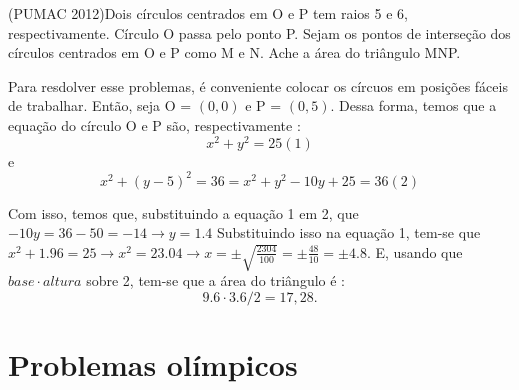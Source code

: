 \documentclass{article}
\begin{document}
\begin{tcolorbox}[colback=blue!5!white,colframe=blue!75!black,title=Problema 2]
(PUMAC 2012)Dois círculos centrados em O e P tem raios 5 e 6, respectivamente.
Círculo O passa pelo ponto P. Sejam os pontos de interseção dos círculos centrados em O e P como M e N.
Ache a área do triângulo MNP. 
\end{tcolorbox}
\begin{center}
\end{center}

Para resdolver esse problemas, é conveniente colocar os círcuos em posições fáceis de trabalhar. Então, seja O = $(0,0)$ e P = $(0,5)$. Dessa forma, temos que a equação do círculo O e P são, respectivamente : 
$$
x^2+ y^2 = 25 (1)
$$
e
$$
x^2 + (y-5)^2 = 36 = x^2 + y^2 - 10y + 25 = 36 (2)
$$

Com isso, temos que, substituindo a equação 1 em 2, que $-10y = 36-50 = -14 \xrightarrow{} y = 1.4$ Substituindo isso na equação 1, tem-se que $x^2 + 1.96 = 25 \xrightarrow{} x^2 = 23.04 \xrightarrow{} x = \pm \sqrt{\frac{2304}{100}} = \pm \frac{48}{10} = \pm 4.8$. E, usando que $base \cdot altura $ sobre 2, tem-se que a área do triângulo é :
$$9.6 \cdot 3.6 / 2 = 17,28.$$

\section{Problemas olímpicos }
\end{document}
